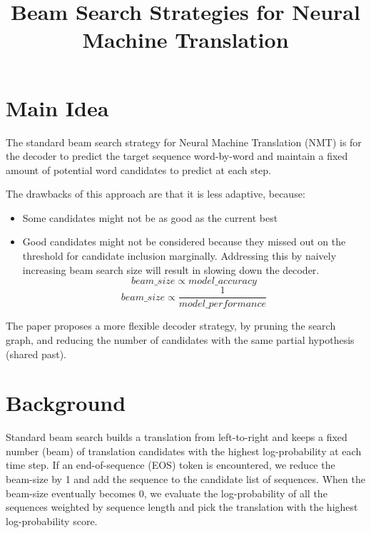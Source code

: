 \documentclass[12pt]{scrartcl}
\begin{document}
\title{Beam Search Strategies for Neural Machine Translation}
\author{}
\date{}
\maketitle

\section{Main Idea}
  The standard beam search strategy for Neural Machine Translation (NMT) is for the decoder to predict the target sequence word-by-word and maintain a fixed amount of potential word candidates to predict at each step. 
  
  The drawbacks of this approach are that it is less adaptive, because: 
  \begin{itemize}
    \item Some candidates might not be as good as the current best
    \item Good candidates might not be considered because they missed out on the threshold for candidate inclusion marginally. Addressing this by naively increasing beam search size will result in slowing down the decoder.
    $$beam\_size \propto model\_accuracy$$
    $$beam\_size \propto \frac{1}{model\_performance}$$
  \end{itemize}

  The paper proposes a more flexible decoder strategy, by pruning the search graph, and reducing the number of candidates with the same partial hypothesis (shared past).

\section{Background}
  Standard beam search builds a translation from left-to-right and keeps a fixed
  number (beam) of translation candidates with the highest log-probability at each time step. If an end-of-sequence (EOS) token is encountered, we reduce the beam-size by 1 and add the sequence to the candidate list of sequences. When the beam-size eventually becomes 0, we evaluate the log-probability of all the sequences weighted by sequence length and pick the translation with the highest log-probability score.
\end{document}
